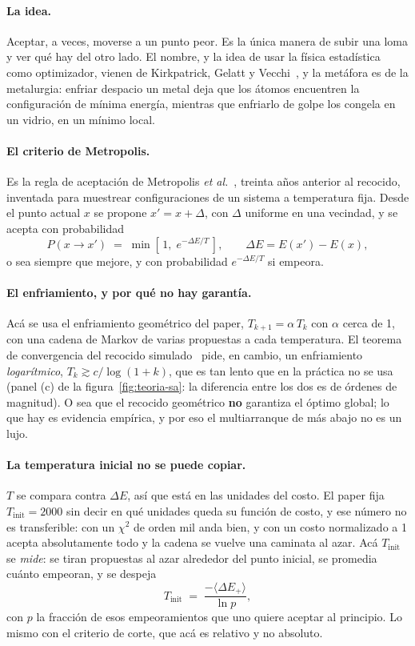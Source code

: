 \documentclass[11pt,a4paper]{article}
\begin{document}
\paragraph{La idea.} Aceptar, a veces, moverse a un punto peor. Es la única
manera de subir una loma y ver qué hay del otro lado. El nombre, y la idea de
usar la física estadística como optimizador, vienen de Kirkpatrick, Gelatt y
Vecchi~\cite{kirkpatrick1983}, y la metáfora es de la metalurgia: enfriar despacio un metal deja que los átomos encuentren la
configuración de mínima energía, mientras que enfriarlo de golpe los congela en
un vidrio, en un mínimo local.

\paragraph{El criterio de Metropolis.} Es la regla de aceptación de
Metropolis \emph{et al.}~\cite{metropolis1953}, treinta años anterior al
recocido, inventada para muestrear configuraciones de un sistema a
temperatura fija. Desde el punto actual $x$ se propone
$x' = x + \Delta$, con $\Delta$ uniforme en una vecindad, y se acepta con
probabilidad
\[
   P(x \to x') \;=\;
   \min\!\left[\,1,\; e^{-\Delta E / T}\,\right],
   \qquad \Delta E = E(x') - E(x),
\]
o sea siempre que mejore, y con probabilidad $e^{-\Delta E/T}$ si empeora.

\paragraph{El enfriamiento, y por qué no hay garantía.} Acá se usa el
enfriamiento geométrico del paper, $T_{k+1} = \alpha\,T_k$ con $\alpha$ cerca
de 1, con una cadena de Markov de varias propuestas a cada temperatura. El
teorema de convergencia del recocido simulado~\cite{geman1984} pide, en
cambio, un enfriamiento \emph{logarítmico}, $T_k \gtrsim c/\log(1+k)$, que es
tan lento que en la
práctica no se usa (panel (c) de la figura~\ref{fig:teoria-sa}: la diferencia
entre los dos es de órdenes de magnitud). O sea que el recocido geométrico
\textbf{no} garantiza el óptimo global; lo que hay es evidencia empírica, y por
eso el multiarranque de más abajo no es un lujo.

\paragraph{La temperatura inicial no se puede copiar.} $T$ se compara contra
$\Delta E$, así que está en las unidades del costo. El paper fija
$T_{\text{init}} = 2000$ sin decir en qué unidades queda su función de costo,
y ese número no es transferible: con un $\chi^2$ de orden mil anda bien, y con
un costo normalizado a 1 acepta absolutamente todo y la cadena se vuelve una
caminata al azar. Acá $T_{\text{init}}$ se \emph{mide}: se tiran propuestas al
azar alrededor del punto inicial, se promedia cuánto empeoran, y se despeja
\[
   T_{\text{init}} \;=\; \frac{-\langle \Delta E_+ \rangle}{\ln p},
\]
con $p$ la fracción de esos empeoramientos que uno quiere aceptar al principio.
Lo mismo con el criterio de corte, que acá es relativo y no absoluto.
\end{document}
